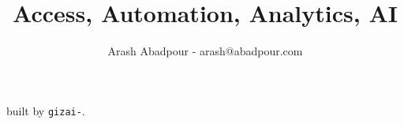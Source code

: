 \documentclass{article}
\title{Access, Automation, Analytics, AI}
\author{Arash Abadpour - arash@abadpour.com}
\begin{document}
\maketitle


\tableofcontents










built by \texttt{gizai-\revision}.
\end{document}
